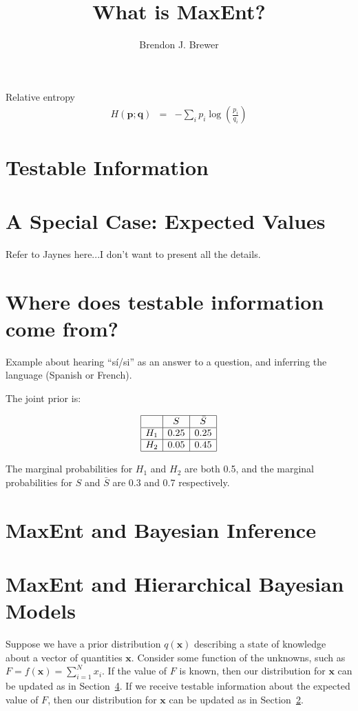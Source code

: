 \documentclass[letterpaper, 11pt]{article}
\title{What is MaxEnt?}
\author{Brendon J. Brewer}
\begin{document}
\maketitle



Relative entropy
\begin{eqnarray}
H(\mathbf{p}; \mathbf{q}) &=& -\sum_i p_i \log\left(\frac{p_i}{q_i}\right) 
\end{eqnarray}

\section{Testable Information}

\section{A Special Case: Expected Values}\label{sec:expectations}
Refer to Jaynes here...I don't want to present all the details.

\section{Where does testable information come from?}

Example about hearing ``sí/si'' as an answer to a question,
and inferring the language (Spanish or French).

The joint prior is:

\begin{eqnarray}
\begin{array}{|c|c|c|}
\hline
	&	S	& \bar{S}\\
\hline
H_1 & 0.25  & 0.25\\
\hline
H_2 & 0.05 & 0.45\\
\hline
\end{array}
\end{eqnarray}

The marginal probabilities for $H_1$ and $H_2$ are both 0.5, and the
marginal probabilities for $S$ and $\bar{S}$ are 0.3 and 0.7 respectively.


\section{MaxEnt and Bayesian Inference}\label{sec:bayes}

\section{MaxEnt and Hierarchical Bayesian Models}
Suppose we have a prior distribution $q(\mathbf{x})$ describing a state of
knowledge about a vector of quantities $\mathbf{x}$. Consider some
function of the unknowns, such as $F=f(\mathbf{x}) = \sum_{i=1}^N x_i$.
If the value of $F$ is known, then our distribution for $\mathbf{x}$ can
be updated as in Section~\ref{sec:bayes}. If we receive testable information
about the expected value of $F$, then our distribution for $\mathbf{x}$ can
be updated as in Section~\ref{sec:expectations}.
\end{document}
